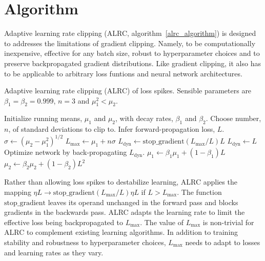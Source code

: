 \documentclass[letterpaper, 10 pt, conference]{ieeeconf}  %
\begin{document}
\section{Algorithm}

Adaptive learning rate clipping (ALRC, algorithm~\ref{alrc_algorithm}) is designed to addresses the limitations of gradient clipping. Namely, to be computationally inexpensive, effective for any batch size, robust to hyperparameter choices and to preserve backpropagated gradient distributions. Like gradient clipping, it also has to be applicable to arbitrary loss funtions and neural network architectures.  

\begin{algorithm}[h]
\caption{Adaptive learning rate clipping (ALRC) of loss spikes. Sensible parameters are $\beta_1 = \beta_2 = 0.999$, $n=3$ and $\mu_1^2 < \mu_2$.}
\begin{algorithmic}
\STATE Initialize running means, $\mu_1$ and $\mu_2$, with decay rates, $\beta_1$ and $\beta_2$.
\STATE Choose number, $n$, of standard deviations to clip to.
  \STATE Infer forward-propagation loss, $L$.
  \STATE $\sigma \leftarrow (\mu_2 - \mu_1^2)^{1/2}$ 
  \STATE $L_\text{max} \leftarrow \mu_1 + n \sigma$
  \STATE $L_\text{dyn} \leftarrow \text{stop\_gradient}(L_\text{max}/L)L$
  \ELSE\STATE $L_\text{dyn} \leftarrow L$
  \ENDIF
  \STATE Optimize network by back-propagating $L_\text{dyn}$.
  \STATE $\mu_1 \leftarrow \beta_1 \mu_1 + (1-\beta_1) L$
  \STATE $\mu_2 \leftarrow \beta_2 \mu_2 + (1-\beta_2) L^2$
\ENDWHILE
\end{algorithmic}
\label{alrc_algorithm}
\end{algorithm}

Rather than allowing loss spikes to destabilize learning, ALRC applies the mapping $\eta L \rightarrow \text{stop\_gradient}(L_\text{max}/L) \eta L$ if $L > L_\text{max}$. The function $\text{stop\_gradient}$ leaves its operand unchanged in the forward pass and blocks gradients in the backwards pass. ALRC adapts the learning rate to limit the effective loss being backpropagated to $L_\text{max}$. The value of $L_\text{max}$ is non-trivial for ALRC to complement existing learning algorithms. In addition to training stability and robustness to hyperparameter choices, $L_\text{max}$ needs to adapt to losses and learning rates as they vary. 
\end{document}
